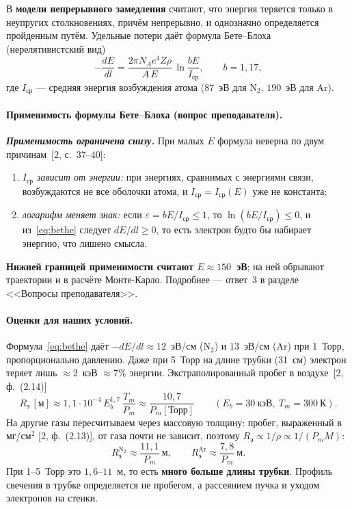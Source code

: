 \documentclass[12pt,a4paper]{article}
\newcommand{\Nt}{\mathrm{N_2}}
\begin{document}
В \textbf{модели непрерывного замедления} считают, что энергия теряется
только в неупругих столкновениях, причём непрерывно, и однозначно
определяется пройденным путём. Удельные потери даёт формула
Бете--Блоха (нерелятивистский вид)
\begin{equation}
    -\frac{dE}{dl} = \frac{2\pi N_A e^4 Z\rho}{A\,E}\,
    \ln\frac{bE}{I_\text{ср}}, \qquad b = 1{,}17,
    \label{eq:bethe}
\end{equation}
где $I_\text{ср}$ --- средняя энергия возбуждения атома ($87$~эВ для
$\Nt$, $190$~эВ для Ar).

\paragraph{Применимость формулы Бете--Блоха (вопрос преподавателя).}
\textbf{\emph{Применимость ограничена снизу.}} При малых $E$ формула
неверна по двум причинам~[2, с.~37--40]:
\begin{enumerate}
  \item \emph{$I_\text{ср}$ зависит от энергии:} при энергиях, сравнимых
        с энергиями связи, возбуждаются не все оболочки атома, и
        $I_\text{ср} = I_\text{ср}(E)$ уже не константа;
  \item \emph{логарифм меняет знак:} если $\varepsilon = bE/I_\text{ср} \le 1$,
        то $\ln(bE/I_\text{ср}) \le 0$, и из~\eqref{eq:bethe} следует
        $dE/dl \ge 0$, то есть электрон будто бы набирает энергию, что
        лишено смысла.
\end{enumerate}
\textbf{Нижней границей применимости считают $E \approx 150$~эВ}; на ней
обрывают траектории и в расчёте Монте-Карло. Подробнее --- ответ~3 в
разделе <<Вопросы преподавателя>>.

\paragraph{Оценки для наших условий.}
Формула~\eqref{eq:bethe} даёт
$-dE/dl \approx 12$~эВ/см ($\Nt$) и $13$~эВ/см (Ar) при 1~Торр,
пропорционально давлению. Даже при 5~Торр на длине трубки (31~см)
электрон теряет лишь $\approx 2$~кэВ $\approx 7\%$ энергии.
Экстраполированный пробег в воздухе~[2, ф.~(2.14)]
\begin{equation}
    R_\text{э}\,[\text{м}] \approx 1{,}1\cdot 10^{-4}\,E_b^{1{,}7}\,
    \frac{T_m}{P_m} \approx \frac{10{,}7}{P_m[\text{Торр}]}
    \qquad (E_b = 30~\text{кэВ},\ T_m = 300~\text{К}).
    \label{eq:range}
\end{equation}
На другие газы пересчитываем через массовую толщину: пробег, выраженный
в мг/см$^2$ [2, ф.~(2.13)], от газа почти не зависит, поэтому
$R_\text{э} \propto 1/\rho \propto 1/(P_m M)$:
\begin{equation}
    R_\text{э}^{\Nt} \approx \frac{11{,}1}{P_m}~\text{м}, \qquad
    R_\text{э}^{\text{Ar}} \approx \frac{7{,}8}{P_m}~\text{м}.
\end{equation}
При 1--5~Торр это $1{,}6$--$11$~м, то есть \textbf{много больше длины трубки}.
Профиль свечения в трубке определяется не пробегом, а рассеянием пучка и
уходом электронов на стенки.
\end{document}
